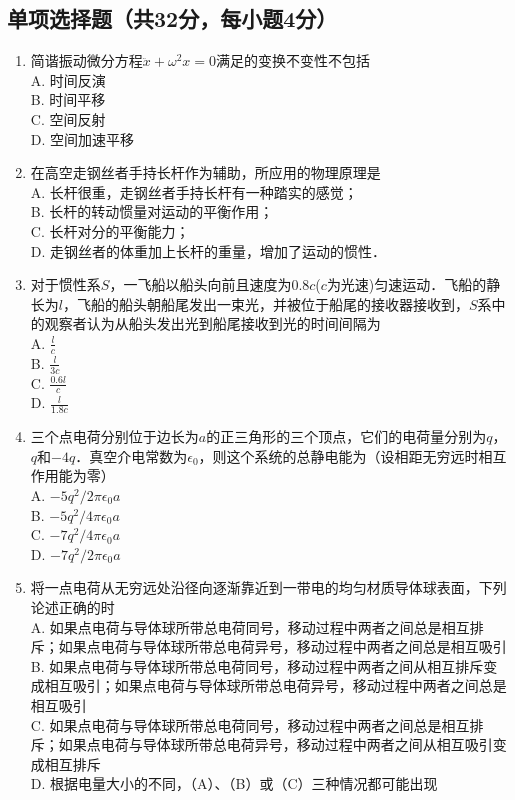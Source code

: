 


\subsection{单项选择题（共32分，每小题4分）}
\begin{enumerate}
\item 简谐振动微分方程$\ddot{x}+{\omega}^2{x}=0$满足的变换不变性不包括\\
A. 时间反演\\
B. 时间平移\\
C. 空间反射\\
D. 空间加速平移\\

\item 在高空走钢丝者手持长杆作为辅助，所应用的物理原理是\\
A. 长杆很重，走钢丝者手持长杆有一种踏实的感觉；\\
B. 长杆的转动惯量对运动的平衡作用；\\
C. 长杆对分的平衡能力；\\
D. 走钢丝者的体重加上长杆的重量，增加了运动的惯性．\\

\item 对于惯性系$S$，一飞船以船头向前且速度为0.8$c$($c$为光速)匀速运动．飞船的静长为$l$，飞船的船头朝船尾发出一束光，并被位于船尾的接收器接收到，$S$系中的观察者认为从船头发出光到船尾接收到光的时间间隔为\\
A. $\frac{l}{c}$\\
B. $\frac{l}{3c}$\\
C. $\frac{0.6l}{c}$\\
D. $\frac{l}{1.8c}$\\

\item 三个点电荷分别位于边长为$a$的正三角形的三个顶点，它们的电荷量分别为$q$，$q$和$-4q$．真空介电常数为$\epsilon_{0}$，则这个系统的总静电能为（设相距无穷远时相互作用能为零）\\
A. $-5q^{2}/2\pi \epsilon_{0} a$\\
B. $-5q^{2}/4\pi \epsilon_{0} a$\\
C. $-7q^{2}/4\pi \epsilon_{0} a$\\
D. $-7q^{2}/2\pi \epsilon_{0} a$\\

\item 将一点电荷从无穷远处沿径向逐渐靠近到一带电的均匀材质导体球表面，下列论述正确的时\\
A. 如果点电荷与导体球所带总电荷同号，移动过程中两者之间总是相互排斥；如果点电荷与导体球所带总电荷异号，移动过程中两者之间总是相互吸引\\
B. 如果点电荷与导体球所带总电荷同号，移动过程中两者之间从相互排斥变成相互吸引；如果点电荷与导体球所带总电荷异号，移动过程中两者之间总是相互吸引\\
C. 如果点电荷与导体球所带总电荷同号，移动过程中两者之间总是相互排斥；如果点电荷与导体球所带总电荷异号，移动过程中两者之间从相互吸引变成相互排斥\\
D. 根据电量大小的不同，（A）、（B）或（C）三种情况都可能出现\\


\end{enumerate}
